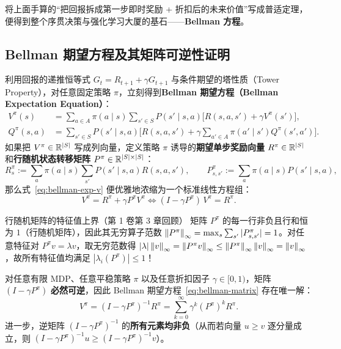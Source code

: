 将上面手算的“把回报拆成第一步即时奖励 + 折扣后的未来价值”写成普适定理，便得到整个序贯决策与强化学习大厦的基石——\textbf{Bellman 方程}。

\subsection{Bellman 期望方程及其矩阵可逆性证明}

利用回报的递推恒等式 $G_t = R_{t+1} + \gamma G_{t+1}$ 与条件期望的塔性质（Tower Property），对任意固定策略 $\pi$，立刻得到\textbf{Bellman 期望方程（Bellman Expectation Equation）}：
\begin{align}
  V^\pi(s) &= \sum_{a \in A} \pi(a \mid s) \sum_{s' \in S} P(s' \mid s, a)\Big[R(s, a, s') + \gamma V^\pi(s')\Big], \label{eq:bellman-exp-v}\\
  Q^\pi(s, a) &= \sum_{s' \in S} P(s' \mid s, a)\Big[R(s, a, s') + \gamma \sum_{a' \in A} \pi(a' \mid s') Q^\pi(s', a')\Big]. \label{eq:bellman-exp-q}
\end{align}
如果把 $V^\pi \in \mathbb{R}^{|S|}$ 写成列向量，定义策略 $\pi$ 诱导的\textbf{期望单步奖励向量} $R^\pi \in \mathbb{R}^{|S|}$ 和\textbf{行随机状态转移矩阵} $P^\pi \in \mathbb{R}^{|S|\times |S|}$：
\[
  R^\pi_s := \sum_{a} \pi(a\mid s) \sum_{s'} P(s'\mid s, a) R(s, a, s'), \qquad
  P^\pi_{s, s'} := \sum_{a} \pi(a\mid s) P(s'\mid s, a),
\]
那么式~\eqref{eq:bellman-exp-v} 便优雅地浓缩为一个标准线性方程组：
\begin{equation}\label{eq:bellman-matrix}
  V^\pi = R^\pi + \gamma P^\pi V^\pi \iff (I - \gamma P^\pi)\, V^\pi = R^\pi.
\end{equation}

\begin{recallBox}{行随机矩阵的特征值上界（第 1 卷第 3 章回顾）}
矩阵 $P^\pi$ 的每一行非负且行和恒为 $1$（行随机矩阵），因此其无穷算子范数 $\left\|P^\pi\right\|_\infty = \max_s \sum_{s'} |P^\pi_{s, s'}| = 1$。对任意特征对 $P^\pi v = \lambda v$，取无穷范数得 $|\lambda|\left\|v\right\|_\infty = \left\|P^\pi v\right\|_\infty \le \left\|P^\pi\right\|_\infty \left\|v\right\|_\infty = \left\|v\right\|_\infty$，故所有特征值均满足 $|\lambda_i(P^\pi)| \le 1$！
\end{recallBox}

\begin{thmBox}
\begin{theorem}\label{thm:bellman-invertible}
对任意有限 MDP、任意平稳策略 $\pi$ 以及任意折扣因子 $\gamma \in [0, 1)$，矩阵 $(I - \gamma P^\pi)$ \textbf{必然可逆}，因此 Bellman 期望方程~\eqref{eq:bellman-matrix} 存在唯一解：
\[
  V^\pi = (I - \gamma P^\pi)^{-1} R^\pi = \sum_{k=0}^{\infty} \gamma^k (P^\pi)^k R^\pi.
\]
进一步，逆矩阵 $(I - \gamma P^\pi)^{-1}$ 的\textbf{所有元素均非负}（从而若向量 $u \ge v$ 逐分量成立，则 $(I - \gamma P^\pi)^{-1} u \ge (I - \gamma P^\pi)^{-1} v$）。
\end{theorem}
\end{thmBox}

